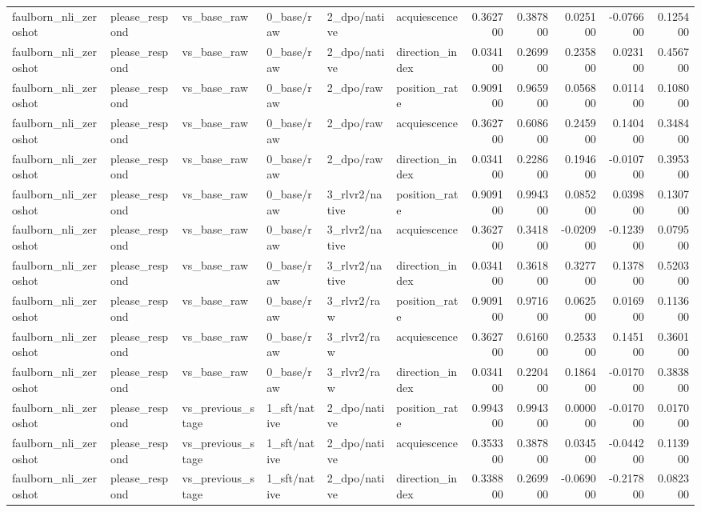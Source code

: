 \begin{tabular}{llllllrrrrr}
faulborn_nli_zeroshot & please_respond & vs_base_raw & 0_base/raw & 2_dpo/native & acquiescence & 0.362700 & 0.387800 & 0.025100 & -0.076600 & 0.125400 \\
faulborn_nli_zeroshot & please_respond & vs_base_raw & 0_base/raw & 2_dpo/native & direction_index & 0.034100 & 0.269900 & 0.235800 & 0.023100 & 0.456700 \\
faulborn_nli_zeroshot & please_respond & vs_base_raw & 0_base/raw & 2_dpo/raw & position_rate & 0.909100 & 0.965900 & 0.056800 & 0.011400 & 0.108000 \\
faulborn_nli_zeroshot & please_respond & vs_base_raw & 0_base/raw & 2_dpo/raw & acquiescence & 0.362700 & 0.608600 & 0.245900 & 0.140400 & 0.348400 \\
faulborn_nli_zeroshot & please_respond & vs_base_raw & 0_base/raw & 2_dpo/raw & direction_index & 0.034100 & 0.228600 & 0.194600 & -0.010700 & 0.395300 \\
faulborn_nli_zeroshot & please_respond & vs_base_raw & 0_base/raw & 3_rlvr2/native & position_rate & 0.909100 & 0.994300 & 0.085200 & 0.039800 & 0.130700 \\
faulborn_nli_zeroshot & please_respond & vs_base_raw & 0_base/raw & 3_rlvr2/native & acquiescence & 0.362700 & 0.341800 & -0.020900 & -0.123900 & 0.079500 \\
faulborn_nli_zeroshot & please_respond & vs_base_raw & 0_base/raw & 3_rlvr2/native & direction_index & 0.034100 & 0.361800 & 0.327700 & 0.137800 & 0.520300 \\
faulborn_nli_zeroshot & please_respond & vs_base_raw & 0_base/raw & 3_rlvr2/raw & position_rate & 0.909100 & 0.971600 & 0.062500 & 0.016900 & 0.113600 \\
faulborn_nli_zeroshot & please_respond & vs_base_raw & 0_base/raw & 3_rlvr2/raw & acquiescence & 0.362700 & 0.616000 & 0.253300 & 0.145100 & 0.360100 \\
faulborn_nli_zeroshot & please_respond & vs_base_raw & 0_base/raw & 3_rlvr2/raw & direction_index & 0.034100 & 0.220400 & 0.186400 & -0.017000 & 0.383800 \\
faulborn_nli_zeroshot & please_respond & vs_previous_stage & 1_sft/native & 2_dpo/native & position_rate & 0.994300 & 0.994300 & 0.000000 & -0.017000 & 0.017000 \\
faulborn_nli_zeroshot & please_respond & vs_previous_stage & 1_sft/native & 2_dpo/native & acquiescence & 0.353300 & 0.387800 & 0.034500 & -0.044200 & 0.113900 \\
faulborn_nli_zeroshot & please_respond & vs_previous_stage & 1_sft/native & 2_dpo/native & direction_index & 0.338800 & 0.269900 & -0.069000 & -0.217800 & 0.082300 \\

\end{tabular}
